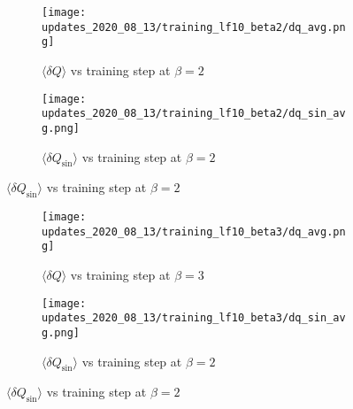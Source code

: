 \begin{figure}[htpb]
  \centering
  \begin{subfigure}[htpb]{0.375\textwidth}
    \texttt{[image: updates\_2020\_08\_13/training\_lf10\_beta2/dq\_avg.png]}
    \caption{\(\langle\delta Q\rangle\) vs training step at \(\beta = 2\)}%
  \end{subfigure}
  \hfill
  \begin{subfigure}[htpb]{0.375\textwidth}
    \texttt{[image: updates\_2020\_08\_13/training\_lf10\_beta2/dq\_sin\_avg.png]}
    \caption{\(\langle\delta Q_{\sin}\rangle\) vs training step at \(\beta = 2\)}%
  \end{subfigure}
\end{figure}

\begin{figure}[htpb]
  \centering
  \begin{subfigure}[htpb]{0.375\textwidth}
    \texttt{[image: updates\_2020\_08\_13/training\_lf10\_beta3/dq\_avg.png]}
    \caption{\(\langle\delta Q\rangle\) vs training step at \(\beta = 3\)}%
  \end{subfigure}
  \hfill
  \begin{subfigure}[htpb]{0.375\textwidth}
    \texttt{[image: updates\_2020\_08\_13/training\_lf10\_beta3/dq\_sin\_avg.png]}
    \caption{\(\langle\delta Q_{\sin}\rangle\) vs training step at \(\beta = 2\)}%
  \end{subfigure}
\end{figure}
